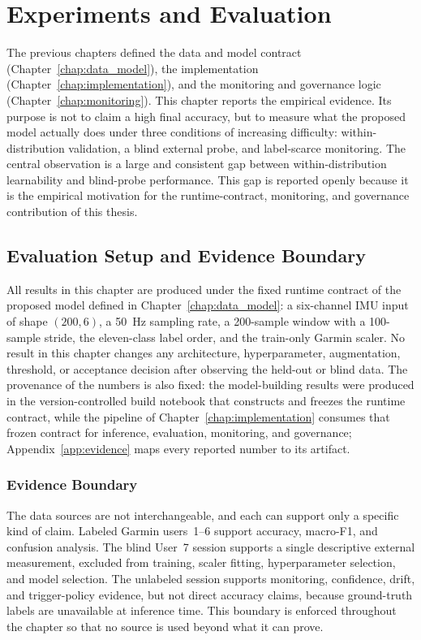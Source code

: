 \chapter{Experiments and Evaluation}
\label{chap:experiments}

The previous chapters defined the data and model contract (Chapter~\ref{chap:data_model}), the implementation (Chapter~\ref{chap:implementation}), and the monitoring and governance logic (Chapter~\ref{chap:monitoring}). This chapter reports the empirical evidence. Its purpose is not to claim a high final accuracy, but to measure what the proposed model actually does under three conditions of increasing difficulty: within-distribution validation, a blind external probe, and label-scarce monitoring. The central observation is a large and consistent gap between within-distribution learnability and blind-probe performance. This gap is reported openly because it is the empirical motivation for the runtime-contract, monitoring, and governance contribution of this thesis.

\section{Evaluation Setup and Evidence Boundary}
\label{sec:ch7_setup}

All results in this chapter are produced under the fixed runtime contract of the proposed model defined in Chapter~\ref{chap:data_model}: a six-channel IMU input of shape \((200,6)\), a 50~Hz sampling rate, a 200-sample window with a 100-sample stride, the eleven-class label order, and the train-only Garmin scaler. No result in this chapter changes any architecture, hyperparameter, augmentation, threshold, or acceptance decision after observing the held-out or blind data. The provenance of the numbers is also fixed: the model-building results were produced in the version-controlled build notebook that constructs and freezes the runtime contract, while the pipeline of Chapter~\ref{chap:implementation} consumes that frozen contract for inference, evaluation, monitoring, and governance; Appendix~\ref{app:evidence} maps every reported number to its artifact.

\subsection{Evidence Boundary}
\label{sec:ch7_evidence_boundary}

The data sources are not interchangeable, and each can support only a specific kind of claim. Labeled Garmin users~1--6 support accuracy, macro-F1, and confusion analysis. The blind User~7 session supports a single descriptive external measurement, excluded from training, scaler fitting, hyperparameter selection, and model selection. The unlabeled session supports monitoring, confidence, drift, and trigger-policy evidence, but not direct accuracy claims, because ground-truth labels are unavailable at inference time. This boundary is enforced throughout the chapter so that no source is used beyond what it can prove.


